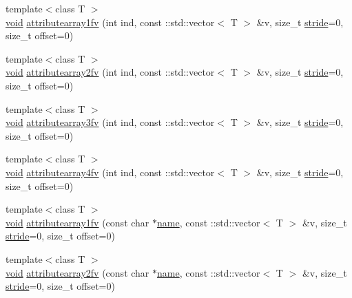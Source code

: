 \begin{DoxyCompactItemize}
\item 
{\footnotesize template$<$class T $>$ }\\\hyperlink{namespacetrimesh_a784ddfd979e1c579bda795a8edfc3f43}{void} \hyperlink{classtrimesh_1_1GLManager_a70295ba41bf0784fee5ef782a002f15b}{attributearray1fv} (int ind, const \+::std\+::vector$<$ T $>$ \&v, size\+\_\+t \hyperlink{namespacetrimesh_adbcc86014e77656be1a9df7ecaae5f2f}{stride}=0, size\+\_\+t offset=0)
\item 
{\footnotesize template$<$class T $>$ }\\\hyperlink{namespacetrimesh_a784ddfd979e1c579bda795a8edfc3f43}{void} \hyperlink{classtrimesh_1_1GLManager_ab9f9aa4baa8e7a746b04082132a26a50}{attributearray2fv} (int ind, const \+::std\+::vector$<$ T $>$ \&v, size\+\_\+t \hyperlink{namespacetrimesh_adbcc86014e77656be1a9df7ecaae5f2f}{stride}=0, size\+\_\+t offset=0)
\item 
{\footnotesize template$<$class T $>$ }\\\hyperlink{namespacetrimesh_a784ddfd979e1c579bda795a8edfc3f43}{void} \hyperlink{classtrimesh_1_1GLManager_a8bbf7b5485678282f10502a4c91c2e4c}{attributearray3fv} (int ind, const \+::std\+::vector$<$ T $>$ \&v, size\+\_\+t \hyperlink{namespacetrimesh_adbcc86014e77656be1a9df7ecaae5f2f}{stride}=0, size\+\_\+t offset=0)
\item 
{\footnotesize template$<$class T $>$ }\\\hyperlink{namespacetrimesh_a784ddfd979e1c579bda795a8edfc3f43}{void} \hyperlink{classtrimesh_1_1GLManager_ad3ef1d86a4d22faa3904c9bec3fce572}{attributearray4fv} (int ind, const \+::std\+::vector$<$ T $>$ \&v, size\+\_\+t \hyperlink{namespacetrimesh_adbcc86014e77656be1a9df7ecaae5f2f}{stride}=0, size\+\_\+t offset=0)
\item 
{\footnotesize template$<$class T $>$ }\\\hyperlink{namespacetrimesh_a784ddfd979e1c579bda795a8edfc3f43}{void} \hyperlink{classtrimesh_1_1GLManager_a656197ed8aacc4c7f903b97e4f7fb648}{attributearray1fv} (const char $\ast$\hyperlink{namespacetrimesh_a7f24cdcfa73387d7fa6aa44676238a79}{name}, const \+::std\+::vector$<$ T $>$ \&v, size\+\_\+t \hyperlink{namespacetrimesh_adbcc86014e77656be1a9df7ecaae5f2f}{stride}=0, size\+\_\+t offset=0)
\item 
{\footnotesize template$<$class T $>$ }\\\hyperlink{namespacetrimesh_a784ddfd979e1c579bda795a8edfc3f43}{void} \hyperlink{classtrimesh_1_1GLManager_a273a2ac2f366fd5594eaf19f90188978}{attributearray2fv} (const char $\ast$\hyperlink{namespacetrimesh_a7f24cdcfa73387d7fa6aa44676238a79}{name}, const \+::std\+::vector$<$ T $>$ \&v, size\+\_\+t \hyperlink{namespacetrimesh_adbcc86014e77656be1a9df7ecaae5f2f}{stride}=0, size\+\_\+t offset=0)

\end{DoxyCompactItemize}
